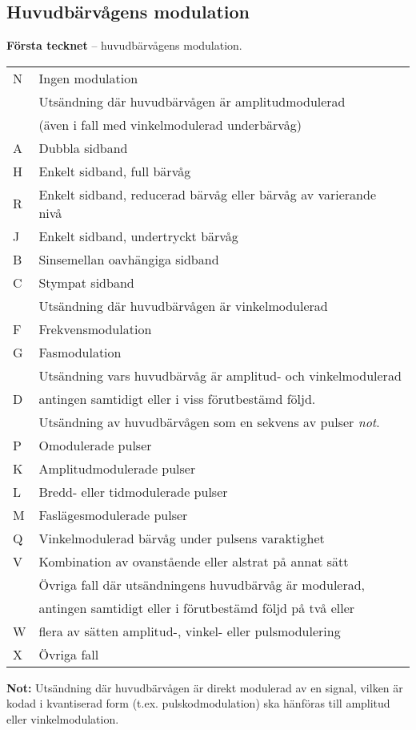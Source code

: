 \subsection{Huvudbärvågens modulation}
\textbf{Första tecknet} -- huvudbärvågens modulation.\\[1ex]
\begin{tabular}[c]{lp{7cm}}
N &	Ingen modulation \\
  &	Utsändning där huvudbärvågen är amplitudmodulerad \\
  &	(även i fall med vinkelmodulerad underbärvåg) \\
A &	Dubbla sidband \\
H &	Enkelt sidband, full bärvåg \\
R &	Enkelt sidband, reducerad bärvåg eller bärvåg av varierande nivå \\
J &	Enkelt sidband, undertryckt bärvåg \\
B &	Sinsemellan oavhängiga sidband \\
C &	Stympat sidband \\
  &	Utsändning där huvudbärvågen är vinkelmodulerad \\
F &	Frekvensmodulation \\
G &	Fasmodulation \\
  &	Utsändning vars huvudbärvåg är amplitud- och vinkelmodulerad \\
D &	antingen samtidigt eller i viss förutbestämd följd. \\
  &	Utsändning av huvudbärvågen som en sekvens av pulser \emph{not}. \\
P  &	Omodulerade pulser \\
K &	Amplitudmodulerade pulser \\
L &Bredd- eller tidmodulerade pulser \\
M &	Faslägesmodulerade pulser \\
Q &	Vinkelmodulerad bärvåg under pulsens varaktighet \\
V &	Kombination av ovanstående eller alstrat på annat sätt \\
  &	Övriga fall där utsändningens huvudbärvåg är modulerad, \\
  &	antingen samtidigt eller i förutbestämd följd på två eller \\
W &	flera av sätten amplitud-, vinkel- eller pulsmodulering \\
X &	Övriga fall \\[1em]
\end{tabular}

\textbf{Not:} Utsändning där huvudbärvågen är direkt modulerad av
en signal, vilken är kodad i kvantiserad form (t.ex.
pulskodmodulation) ska hänföras till amplitud eller
vinkelmodulation.

